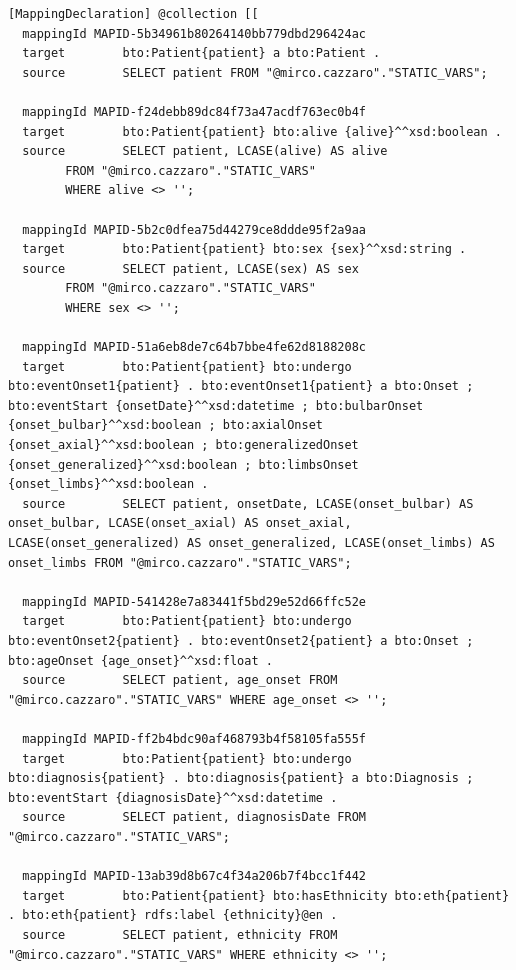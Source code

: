 \begin{lstlisting}[language=OntopNative, caption={Mappings definition between the virtual relational schema exposed by Dremio and the Brainteaser Ontology}, label={lst:mappings}]
  [MappingDeclaration] @collection [[
  mappingId	MAPID-5b34961b80264140bb779dbd296424ac
  target		bto:Patient{patient} a bto:Patient . 
  source		SELECT patient FROM "@mirco.cazzaro"."STATIC_VARS";

  mappingId	MAPID-f24debb89dc84f73a47acdf763ec0b4f
  target		bto:Patient{patient} bto:alive {alive}^^xsd:boolean . 
  source		SELECT patient, LCASE(alive) AS alive
        FROM "@mirco.cazzaro"."STATIC_VARS"
        WHERE alive <> '';

  mappingId	MAPID-5b2c0dfea75d44279ce8ddde95f2a9aa
  target		bto:Patient{patient} bto:sex {sex}^^xsd:string . 
  source		SELECT patient, LCASE(sex) AS sex
        FROM "@mirco.cazzaro"."STATIC_VARS"
        WHERE sex <> '';

  mappingId	MAPID-51a6eb8de7c64b7bbe4fe62d8188208c
  target		bto:Patient{patient} bto:undergo bto:eventOnset1{patient} . bto:eventOnset1{patient} a bto:Onset ; bto:eventStart {onsetDate}^^xsd:datetime ; bto:bulbarOnset {onset_bulbar}^^xsd:boolean ; bto:axialOnset {onset_axial}^^xsd:boolean ; bto:generalizedOnset {onset_generalized}^^xsd:boolean ; bto:limbsOnset {onset_limbs}^^xsd:boolean . 
  source		SELECT patient, onsetDate, LCASE(onset_bulbar) AS onset_bulbar, LCASE(onset_axial) AS onset_axial, LCASE(onset_generalized) AS onset_generalized, LCASE(onset_limbs) AS onset_limbs FROM "@mirco.cazzaro"."STATIC_VARS";

  mappingId	MAPID-541428e7a83441f5bd29e52d66ffc52e
  target		bto:Patient{patient} bto:undergo bto:eventOnset2{patient} . bto:eventOnset2{patient} a bto:Onset ; bto:ageOnset {age_onset}^^xsd:float . 
  source		SELECT patient, age_onset FROM "@mirco.cazzaro"."STATIC_VARS" WHERE age_onset <> '';

  mappingId	MAPID-ff2b4bdc90af468793b4f58105fa555f
  target		bto:Patient{patient} bto:undergo bto:diagnosis{patient} . bto:diagnosis{patient} a bto:Diagnosis ; bto:eventStart {diagnosisDate}^^xsd:datetime . 
  source		SELECT patient, diagnosisDate FROM "@mirco.cazzaro"."STATIC_VARS";

  mappingId	MAPID-13ab39d8b67c4f34a206b7f4bcc1f442
  target		bto:Patient{patient} bto:hasEthnicity bto:eth{patient} . bto:eth{patient} rdfs:label {ethnicity}@en . 
  source		SELECT patient, ethnicity FROM "@mirco.cazzaro"."STATIC_VARS" WHERE ethnicity <> '';


\end{lstlisting}
